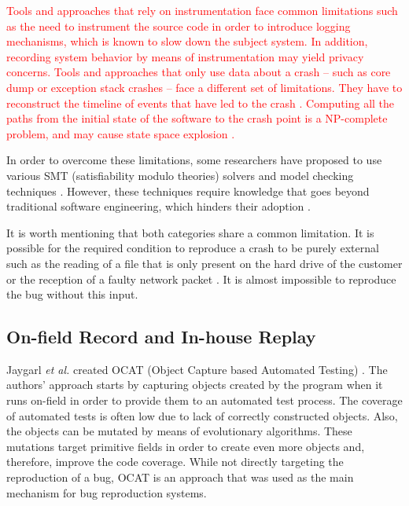 \documentclass[times, doublespace]{smrauth}
\newcommand{\red}[1]{\textcolor{red}{#1}}
\begin{document}
\red{Tools and approaches that rely on instrumentation face common limitations such as the need to instrument the source code in order to introduce logging mechanisms\cite{Narayanasamy2005,Jaygarl,Artzi2008}, which is known to slow down the subject system.
In addition,  recording system behavior by means of instrumentation may yield privacy concerns.
Tools and approaches that only use data about a crash -- such as core dump or exception stack crashes -- face a different set of limitations. They have to reconstruct the timeline of events that have led to the crash \cite{Chen2013a,Nayrolles2015}. Computing all the paths from the initial state of the software to the crash point is a NP-complete problem, and may cause state space explosion \cite{Chen2013a,Clause2007}.}

In order to overcome these limitations, some researchers have proposed to
use various SMT (satisfiability modulo theories) solvers \cite{Dutertre2006}
and model checking techniques \cite{Visser2003}.
However, these techniques require knowledge that goes beyond traditional
software engineering, which hinders their adoption  \cite{Visser2004}.

It is worth mentioning that both categories share a common limitation.
It is possible for the required condition to reproduce a crash to be purely
external such as the reading of a file that is only present on the hard
drive of the customer or the reception of a faulty network packet
\cite{Chen2013a, Nayrolles2015}.
It is almost impossible to reproduce the bug without this input.



\subsection{On-field Record and In-house Replay}

Jaygarl {\it et al.} created OCAT (Object Capture based Automated Testing)
\cite{Jaygarl}.
The authors' approach starts by capturing objects created by the program when
it runs on-field in order to provide them to an automated test process.
The coverage of automated tests is often low due to lack of correctly
constructed objects. Also, the objects can be mutated by means of
evolutionary algorithms.
These mutations target primitive fields in order to create even more objects
and, therefore, improve the code coverage.
While not directly targeting the reproduction of a bug,
OCAT is an approach that was used as the main mechanism
for bug reproduction systems.
\end{document}
